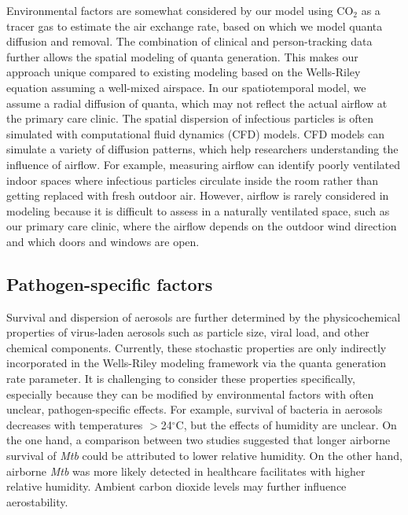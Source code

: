 \documentclass[fleqn,11pt]{wlscirep_supp}
\begin{document}
Environmental factors are somewhat considered by our model using CO$_2$ as a tracer gas to estimate the air exchange rate, based on which we model quanta diffusion and removal. The combination of clinical and person-tracking data further allows the spatial modeling of quanta generation. This makes our approach unique compared to existing modeling based on the Wells-Riley equation assuming a well-mixed airspace\cite{Riley1961Book,Rudnick2003IndoorAir}. In our spatiotemporal model, we assume a radial diffusion of quanta, which may not reflect the actual airflow at the primary care clinic. The spatial dispersion of infectious particles is often simulated with computational fluid dynamics (CFD) models\cite{Vuorinen2020SafSci,Jung2021InfectChemo,Li2021BuildEnv}. CFD models can simulate a variety of diffusion patterns, which help researchers understanding the influence of airflow. For example, measuring airflow can identify poorly ventilated indoor spaces where infectious particles circulate inside the room rather than getting replaced with fresh outdoor air\cite{Li2021BuildEnv}. However, airflow is rarely considered in modeling because it is difficult to assess in a naturally ventilated space, such as our primary care clinic, where the airflow depends on the outdoor wind direction and which doors and windows are open. 

\subsection{Pathogen-specific factors}

Survival and dispersion of aerosols are further determined by the physicochemical properties of virus-laden aerosols such as particle size, viral load, and other chemical components\cite{Wang2021Science}. Currently, these stochastic properties are only indirectly incorporated in the Wells-Riley modeling framework via the quanta generation rate parameter\cite{Riley1961Book,Rudnick2003IndoorAir}. It is challenging to consider these properties specifically, especially because they can be modified by environmental factors with often unclear, pathogen-specific effects\cite{Songer1967,Chan2011AdvVir,Fernstrom2013JoP,Cox1995Book,Fernstrom2013JoP,Tang2009Interface}. For example, survival of bacteria in aerosols decreases with temperatures $>$24$^{\circ}$C, but the effects of humidity are unclear\cite{Tang2009Interface}. On the one hand, a comparison between two studies suggested that longer airborne survival of \emph{Mtb} could be attributed to lower relative humidity\cite{Loudon1969AMRRD,Lever2000LettersAppliedMicrobio}. On the other hand, airborne \emph{Mtb} was more likely detected in healthcare facilitates with higher relative humidity\cite{Sornboot2019IJTLD,Matuka2021IJERP}. Ambient carbon dioxide levels may further influence aerostability\cite{Haddrell2024NatCommun}.    
\end{document}
